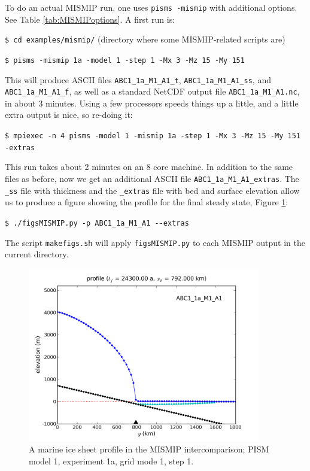 \documentclass[11pt,final]{amsart}
\begin{document}
To do an actual MISMIP run, one uses \verb|pisms -mismip| with additional options.  See Table \ref{tab:MISMIPoptions}.  A first run is:

\verb|$ cd examples/mismip/|  \hfill \scriptsize(directory where some MISMIP-related scripts are)\normalsize

\verb|$ pisms -mismip 1a -model 1 -step 1 -Mx 3 -Mz 15 -My 151|

\noindent This will produce ASCII files \verb|ABC1_1a_M1_A1_t|, \verb|ABC1_1a_M1_A1_ss|, and \verb|ABC1_1a_M1_A1_f|, as well as a standard NetCDF output file \verb|ABC1_1a_M1_A1.nc|, in about 3 minutes.  Using a few processors speeds things up a little, and a little extra output is nice, so re-doing it:

\verb|$ mpiexec -n 4 pisms -model 1 -mismip 1a -step 1 -Mx 3 -Mz 15 -My 151 -extras|

\noindent This run takes about 2 minutes on an 8 core machine.  In addition to the same files as before, now we get an additional ASCII file \verb|ABC1_1a_M1_A1_extras|.  The \verb|_ss| file with thickness and the \verb|_extras| file with bed and surface elevation allow us to produce a figure showing the profile for the final steady state, Figure \ref{fig:MISMIPmodel1exper1aM1A1}:

\verb|$ ./figsMISMIP.py -p ABC1_1a_M1_A1 --extras|

\noindent The script \verb|makefigs.sh| will apply \verb|figsMISMIP.py| to each MISMIP output in the current directory.

\begin{figure}[ht]
\includegraphics[width=4.0in,keepaspectratio=true]{figs/profile_EBU1_1a_M1_A1}
\caption{A marine ice sheet profile in the MISMIP intercomparison; PISM model 1, experiment 1a, grid mode 1, step 1.}
\label{fig:MISMIPmodel1exper1aM1A1}
\end{figure}
\end{document}
